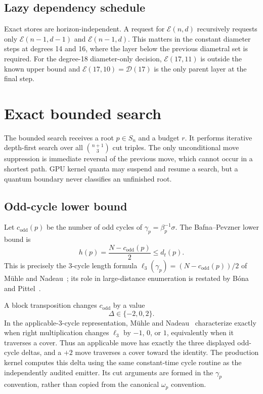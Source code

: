 \documentclass[11pt]{article}
\theoremstyle{definition}
\theoremstyle{remark}
\newcommand{\dist}{d_t}
\newcommand{\E}{\mathcal E}
\newcommand{\D}{\mathcal D}
\begin{document}
\subsection{Lazy dependency schedule}

Exact stores are horizon-independent.  A request for $\E(n,d)$ recursively
requests only $\E(n-1,d-1)$ and $\E(n-1,d)$.  This matters in the constant
diameter steps at degrees 14 and 16, where the layer below the previous
diametral set is required.  For the degree-18 diameter-only decision,
$\E(17,11)$ is outside the known upper bound and $\E(17,10)=\D(17)$ is the
only parent layer at the final step.

\section{Exact bounded search}
\label{sec:search}

The bounded search receives a root $p\in S_n$ and a budget $r$.  It performs
iterative depth-first search over all $\binom{n+1}{3}$ cut triples.  The only
unconditional move suppression is immediate reversal of the previous move,
which cannot occur in a shortest path.  GPU kernel quanta may suspend and
resume a search, but a quantum boundary never classifies an unfinished root.

\subsection{Odd-cycle lower bound}

Let $c_{\mathrm{odd}}(p)$ be the number of odd cycles of
$\gamma_p=\beta_p^{-1}\sigma$.  The Bafna--Pevzner lower bound is
\[
  h(p)=\frac{N-c_{\mathrm{odd}}(p)}{2}
  \leq\dist(p).                                 \tag{6.1}
\]
This is precisely the 3-cycle length formula
$\ell_3(\gamma_p)=(N-c_{\mathrm{odd}}(p))/2$ of M\"uhle and
Nadeau~\cite[Proposition~3.1]{MuhleNadeau2019}; its role in large-distance
enumeration is restated by B\'ona and
Pittel~\cite[Section~4]{BonaPittel2025}.

A block transposition changes $c_{\mathrm{odd}}$ by a value
\[
  \Delta\in\{-2,0,2\}.
\]
In the applicable-3-cycle representation, M\"uhle and
Nadeau~\cite[Proposition~3.2 and Corollary~3.3]{MuhleNadeau2019}
characterize exactly when right multiplication changes $\ell_3$ by
$-1$, $0$, or $1$, equivalently when it traverses a cover.  Thus an
applicable move has exactly the three displayed odd-cycle deltas, and a
$+2$ move traverses a cover toward the identity.
The production kernel computes this delta using the same constant-time cycle
routine as the independently audited emitter.  Its cut arguments are formed
in the $\gamma_p$ convention, rather than copied from the canonical
$\omega_p$ convention.
\end{document}
